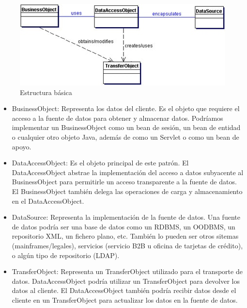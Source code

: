 \documentclass[a4paper,12pt]{article}
\begin{document}
\begin{figure}[H]
\begin{center}
 \includegraphics[width=13cm]{clases.jpg}
 \caption{Estructura básica \cite{oracle}}
 \label{fig:control}
\end{center}
\end{figure}

\begin{itemize}
  \item BusinessObject: Representa los datos del cliente. Es el objeto que 
requiere el acceso a la fuente de datos para obtener y almacenar datos. 
Podríamos implementar un BusinessObject como un bean de sesión, un bean de 
entidad o cualquier otro objeto Java, además de como un Servlet o como un bean 
de apoyo.
  \item DataAccessObject: Es el objeto principal de este patrón. El 
DataAccessObject abstrae la implementación del acceso a datos subyacente al 
BusinessObject para permitirle un acceso transparente a la fuente de datos. El 
BusinessObject también delega las operaciones de carga y almacenamiento en el 
DataAccessObject.
  \item DataSource: Representa la implementación de la fuente de datos. Una 
fuente de datos podría ser una base de datos como un RDBMS, un OODBMS, un 
repositorio XML, un fichero plano, etc. También lo pueden ser otros sitemas 
(mainframes/legales), servicios (servicio B2B u oficina de tarjetas de 
crédito), o algún tipo de repositorio (LDAP).
  \item TransferObject: Representa un TransferObject utilizado para el 
transporte de datos. DataAccessObject podría utilizar un TransferObject para 
devolver los datos al cliente. El DataAccessObject también podría recibir datos 
desde el cliente en un TransferObject para actualizar los datos en la fuente de 
datos.
\end{itemize}
\end{document}
